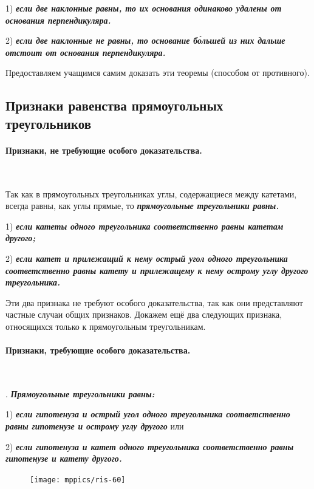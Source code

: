 \documentclass[twoside]{book}
\begin{document}
1) \textbf{\emph{если две наклонные равны, то их основания одинаково удалены от основания перпендикуляра.}}

2) \textbf{\emph{если две наклонные не равны, то основание б\'{о}льшей из них дальше отстоит от основания перпендикуляра.}}

Предоставляем учащимся самим доказать эти теоремы (способом от противного).

\subsection*{Признаки равенства прямоугольных треугольников}

\paragraph{Признаки, не требующие особого доказательства.}\label{1938/56}\ 

Так как в прямоугольных треугольниках углы, содержащиеся между катетами, всегда равны, как углы прямые, то \textbf{\emph{прямоугольные треугольники равны.}}

1) \textbf{\emph{если катеты одного треугольника соответственно равны катетам другого;}}

2) \textbf{\emph{если катет и прилежащий к нему острый угол одного треугольника соответственно равны катету и прилежащему к нему острому углу другого треугольника.}}

Эти два признака не требуют особого доказательства, так как они представляют частные случаи общих признаков.
Докажем ещё два следующих признака, относящихся только к прямоугольным треугольникам.

\paragraph{Признаки, требующие особого доказательства.}\label{1938/57}\ 

.
\textbf{\emph{Прямоугольные треугольники равны:}}

1) \textbf{\emph{если гипотенуза и острый угол одного треугольника соответственно равны гипотенузе и острому углу другого}} или

2) \textbf{\emph{если гипотенуза и катет одного треугольника соответственно равны гипотенузе и катету другого.}}

\begin{figure}[h!]
\centering
\texttt{[image: mppics/ris-60]}
\caption{}\label{1938/ris-60}
\end{figure}
\end{document}
